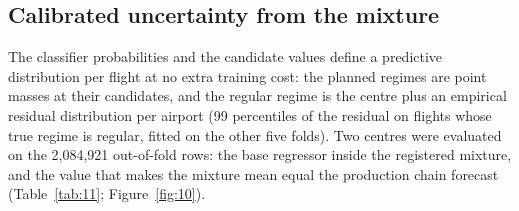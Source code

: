 \documentclass[11pt,a4paper]{article}
\begin{document}
\subsection{Calibrated uncertainty from the mixture}\label{calibrated-uncertainty-from-the-mixture}

The classifier probabilities and the candidate values define a predictive distribution per flight at no extra training cost: the planned regimes are point masses at their candidates, and the regular regime is the centre plus an empirical residual distribution per airport (99 percentiles of the residual on flights whose true regime is regular, fitted on the other five folds). Two centres were evaluated on the 2,084,921 out-of-fold rows: the base regressor inside the registered mixture, and the value that makes the mixture mean equal the production chain forecast (Table~\ref{tab:11}; Figure~\ref{fig:10}).
\end{document}
